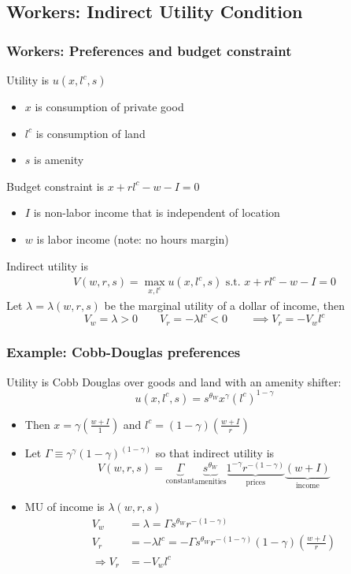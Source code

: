 \documentclass[11pt,notes=hide,aspectratio=169]{beamer}
\begin{document}
\subsection{Workers: Indirect Utility Condition}
\begin{frame}
\frametitle{Workers: Preferences and budget constraint}
Utility is $u(x, l^c, s)$
\begin{itemize}
\item  $x$ is consumption of private good
\item  $l^c$ is consumption of land
\item  $s$ is amenity
\end{itemize}
Budget constraint is $x + rl^c - w - I = 0$
\begin{itemize}
\item $I$ is non-labor income that is independent of location %
\item $w$ is labor income (note: no hours margin)
\end{itemize}
Indirect utility is
\begin{align*}
V(w, r, s)  = \max_{x, l^c} u(x, l^c, s) \text{ s.t. }  x + rl^c - w - I = 0
\end{align*}
Let $\lambda  = \lambda(w, r, s)$ be the marginal utility of a dollar of income, then 
\begin{equation*}
V_w = \lambda >0
\qquad 
V_r = -\lambda l^c <0 
\qquad 
\implies
V_r = - V_w l^c
\end{equation*}
\end{frame}
\begin{frame}
\frametitle{Example: Cobb-Douglas preferences}
Utility is Cobb Douglas over goods and land with an amenity shifter: 
$$u(x, l^c, s)=s^{\theta_W} x^{\gamma} (l^c)^{1-\gamma}$$
\vspace{-7mm}
\begin{itemize}
\item Then $x=\gamma \left(\frac{w + I}{1} \right)$ and $l^c=(1-\gamma)\left(\frac{w + I}{r}\right)$ \medskip
\item Let $\Gamma \equiv \gamma^\gamma (1-\gamma)^{(1-\gamma)}$ so that indirect utility is
\begin{equation*}
V(w, r, s)  = 
\underbrace{\Gamma}_{\text{constant}} 
\underbrace{s^{\theta_W}}_{\text{amenities}} 
\underbrace{1^{-\gamma} r^{-(1-\gamma)}}_{\text{prices}}
\underbrace{(w + I)}_{\text{income}}
\end{equation*}
\item MU of income is $\lambda(w, r, s)$ 
\begin{align*}
V_w &= \lambda = \Gamma s^{\theta_W} r^{-(1-\gamma)}  \\
V_r &= -\lambda l^c =  -\Gamma s^{\theta_W} r^{-(1-\gamma)} (1-\gamma)\left(\frac{w + I}{r}\right) \\
\Rightarrow  V_r &= - V_w l^c 
\end{align*}
\end{itemize}
\end{frame}
\end{document}
